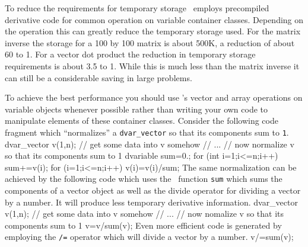 \documentclass[12pt]{book}
\begin{document}
To reduce the requirements for temporary storage \AD\ employs
precompiled derivative code for common operation on variable
container classes. Depending on the operation this can greatly
reduce the temporary storage used. For the matrix inverse the
storage for a 100 by 100 matrix is about 500K, a reduction
of about 60 to 1. For a vector dot product the reduction in
temporary storage requirements is about 3.5 to 1. While
this is much less than the matrix inverse it can still be a considerable
saving in large problems.

To achieve the best performance you should
use \AD's vector and array operations on variable objects whenever
possible rather than writing your own code to manipulate elements of
these container classes. 
Consider the following code fragment which ``normalizes'' a
{\tt dvar\_vector} so that its components sum to {\tt 1}.
\beginexample
dvar_vector v(1,n);
// get some data into v somehow
// ...
// now normalize v so that its components sum to 1
dvariable sum=0.;
for (int i=1;i<=n;i++)
{
  sum+=v(i);
}
for (i=1;i<=n;i++)
{
  v(i)=v(i)/sum;
}
\endexample
{}
The same normalization can be achieved by 
the following code which uses the \AD\ function {\tt sum} which
sums the components of a vector object as well as the divide operator  
for dividing a vector by a number. It will produce less temporary
derivative information.
\beginexample
dvar_vector v(1,n);
// get some data into v somehow
// ...
// now nomalize v so that its components sum to 1
v=v/sum(v);
\endexample
Even more efficient code is generated by employing the {\tt /=} 
operator which will divide a vector by a number.
\beginexample
v/=sum(v);
\endexample

\end{document}
